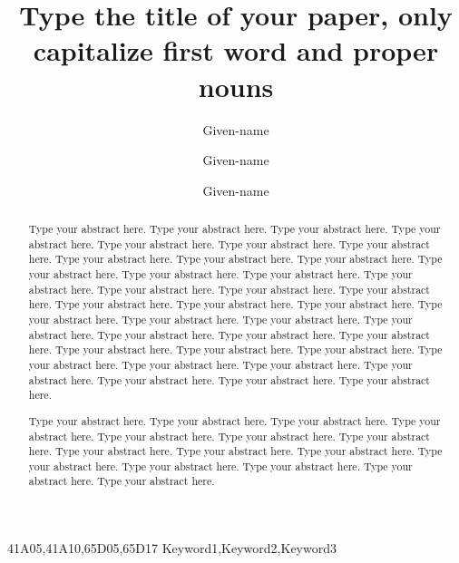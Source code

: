 \documentclass[times,twocolumn,final,authoryear]{elsarticle}
\begin{document}
\begin{frontmatter}

\title{Type the title of your paper, only capitalize first
word and proper nouns}

\author[1]{Given-name } 
\author[2]{Given-name }
\author[2]{Given-name }

\address[1]{Affiliation 1, Address, City and Postal Code, Country}
\address[2]{Affiliation 2, Address, City and Postal Code, Country}



\begin{abstract}
Type your abstract here. Type your abstract here. Type your abstract
here. Type your abstract here. Type your abstract here. Type your
abstract here. Type your abstract here. Type your abstract here. Type
your abstract here. Type your abstract here. Type your abstract here.
Type your abstract here. Type your abstract here.
Type your abstract here. Type your abstract here. Type your abstract
here. Type your abstract here. Type your abstract here. Type your
abstract here. Type your abstract here. Type your abstract here. Type
your abstract here. Type your abstract here. Type your abstract here.
Type your abstract here. Type your abstract here.
Type your abstract here. Type your abstract here. Type your abstract
here. Type your abstract here. Type your abstract here. Type your
abstract here. Type your abstract here. Type your abstract here. Type
your abstract here. Type your abstract here. Type your abstract here.


Type your abstract here. Type your abstract here.
Type your abstract here. Type your abstract here. Type your abstract
here. Type your abstract here. Type your abstract here. Type your
abstract here. Type your abstract here. Type your abstract here. Type
your abstract here. Type your abstract here. Type your abstract here.
Type your abstract here. Type your abstract here.
\end{abstract}

\begin{keyword}
\MSC 41A05\sep 41A10\sep 65D05\sep 65D17
\KWD Keyword1\sep Keyword2\sep Keyword3

\end{keyword}

\end{frontmatter}
\end{document}
